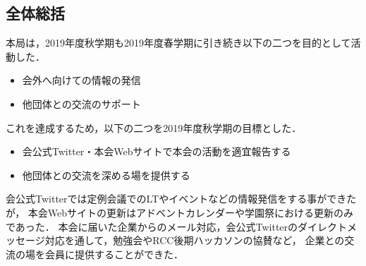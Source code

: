 \subsection*{全体総括}


本局は，2019年度秋学期も2019年度春学期に引き続き以下の二つを目的として活動した．
\begin{itemize}
	\item 会外へ向けての情報の発信
	\item 他団体との交流のサポート
\end{itemize}
これを達成するため，以下の二つを2019年度秋学期の目標とした．
\begin{itemize}
	\item 会公式Twitter・本会Webサイトで本会の活動を適宜報告する
	\item 他団体との交流を深める場を提供する
\end{itemize}

会公式Twitterでは定例会議でのLTやイベントなどの情報発信をする事ができたが，
本会Webサイトの更新はアドベントカレンダーや学園祭における更新のみであった．
本会に届いた企業からのメール対応，会公式Twitterのダイレクトメッセージ対応を通して，勉強会やRCC後期ハッカソンの協賛など，
企業との交流の場を会員に提供することができた．
